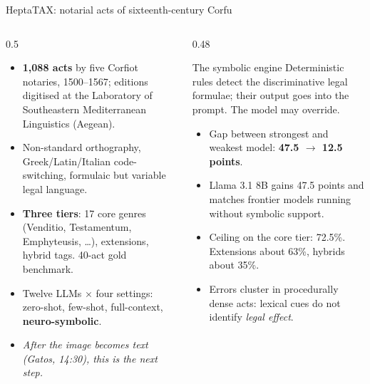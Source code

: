 \documentclass[aspectratio=169, 10pt]{beamer}
\newcommand{\key}[1]{\textcolor{aegean}{\textbf{#1}}}
\newcommand{\hl}[1]{\textcolor{terracotta}{\textbf{#1}}}
\begin{document}
\begin{frame}{HeptaTAX: notarial acts of sixteenth-century Corfu}
  \small
  \begin{columns}[T]
    \begin{column}{0.5\textwidth}
      \begin{itemize}
        \item \key{1,088 acts} by five Corfiot notaries, 1500--1567; editions digitised at the Laboratory of Southeastern Mediterranean Linguistics (Aegean).
        \item Non-standard orthography, Greek/Latin/Italian code-switching, formulaic but variable legal language.
        \item \key{Three tiers}: 17 core genres (Venditio, Testamentum, Emphyteusis, \ldots), extensions, hybrid tags. 40-act gold benchmark.
        \item Twelve LLMs $\times$ four settings: zero-shot, few-shot, full-context, \textbf{neuro-symbolic}.
        \item[] \textcolor{slate}{\textit{After the image becomes text (Gatos, 14:30), this is the next step.}}
      \end{itemize}
    \end{column}
    \begin{column}{0.48\textwidth}
      \begin{block}{The symbolic engine}
        Deterministic rules detect the discriminative legal formulae; their output goes into the prompt. The model may override.
      \end{block}
      \begin{itemize}
        \item Gap between strongest and weakest model: \hl{47.5 $\rightarrow$ 12.5 points}.
        \item Llama 3.1 8B gains 47.5 points and matches frontier models running without symbolic support.
        \item Ceiling on the core tier: 72.5\%. Extensions about 63\%, hybrids about 35\%.
        \item Errors cluster in procedurally dense acts: lexical cues do not identify \emph{legal effect}.
      \end{itemize}
    \end{column}
  \end{columns}
\end{frame}
\end{document}
